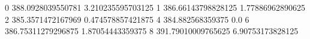 0 388.0928039550781 3.210235595703125
1 386.66143798828125 1.77886962890625
2 385.3571472167969 0.474578857421875
4 384.882568359375 0.0
6 386.75311279296875 1.87054443359375
8 391.79010009765625 6.90753173828125
